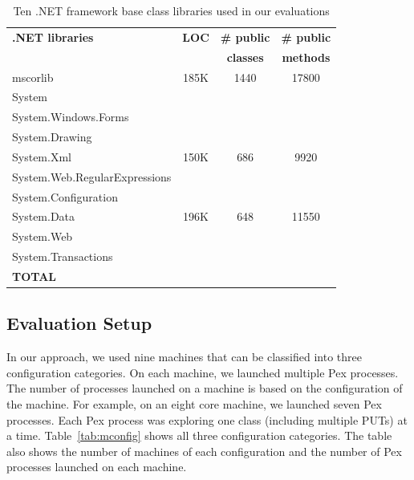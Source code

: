 \setlength{\tabcolsep}{1pt}
\begin{table}[t]
\begin{SmallOut}
\begin{CodeOut}
\begin{center}
\begin {tabular} {|l|c|c|c|}
\hline
\textbf{.NET libraries} & \textbf{LOC} & \textbf{\# public} & \textbf{\# public}\\ 
 & & \textbf{classes} & \textbf{methods}\\ 
\hline
\hline  mscorlib & 185K & 1440 & 17800 \\
\hline  System & & & \\
\hline  System.Windows.Forms & & & \\
\hline  System.Drawing & & & \\
\hline  System.Xml & 150K & 686 & 9920 \\
\hline  System.Web.RegularExpressions & & & \\
\hline  System.Configuration & & & \\
\hline  System.Data & 196K & 648 & 11550 \\
\hline  System.Web &  & & \\
\hline  System.Transactions & & & \\
\hline \textbf{TOTAL} &  &  &   \\
\hline
\end{tabular}
\end{center}
\end{CodeOut}
\end{SmallOut}\vspace*{-4ex}
\centering \caption {\label{tab:subjects}Ten .NET framework base class libraries used in our evaluations}
\end{table}

\subsection{Evaluation Setup}

In our approach, we used nine machines that can be classified into three configuration categories. On each machine, we launched multiple Pex processes. The number of processes launched on a machine is based on the configuration of the machine. For example, on an eight core machine, we launched seven Pex processes. Each Pex process was exploring one class (including multiple PUTs) at a time. Table~\ref{tab:mconfig} shows all three configuration categories. The table also shows the number of machines of each configuration and the number of Pex processes launched on each machine.

